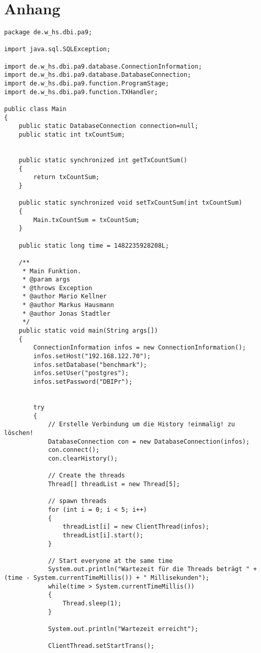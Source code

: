 \section{Anhang}

\begin{lstlisting}[caption={Main}, label={lst:pr1}]
package de.w_hs.dbi.pa9;

import java.sql.SQLException;

import de.w_hs.dbi.pa9.database.ConnectionInformation;
import de.w_hs.dbi.pa9.database.DatabaseConnection;
import de.w_hs.dbi.pa9.function.ProgramStage;
import de.w_hs.dbi.pa9.function.TXHandler;

public class Main 
{
	public static DatabaseConnection connection=null;
	public static int txCountSum;
	

	public static synchronized int getTxCountSum()
	{
		return txCountSum;
	}

	public static synchronized void setTxCountSum(int txCountSum)
	{
		Main.txCountSum = txCountSum;
	}

	public static long time = 1482235928208L;
	
	/**
	 * Main Funktion.
	 * @param args
	 * @throws Exception
	 * @author Mario Kellner
	 * @author Markus Hausmann
	 * @author Jonas Stadtler
	 */
	public static void main(String args[])
	{
		ConnectionInformation infos = new ConnectionInformation();
		infos.setHost("192.168.122.70");
		infos.setDatabase("benchmark");
		infos.setUser("postgres");
		infos.setPassword("DBIPr");
		
	
		try
		{
			// Erstelle Verbindung um die History !einmalig! zu löschen!			
			DatabaseConnection con = new DatabaseConnection(infos);
			con.connect();
			con.clearHistory();
			
		    // Create the threads
		    Thread[] threadList = new Thread[5];

		    // spawn threads
		    for (int i = 0; i < 5; i++)
		    {
		        threadList[i] = new ClientThread(infos);
		        threadList[i].start();
		    }
		    
		    // Start everyone at the same time
		    System.out.println("Wartezeit für die Threads beträgt " + (time - System.currentTimeMillis()) + " Millisekunden");
		    while(time > System.currentTimeMillis())
		    {
		    	Thread.sleep(1);
		    }
		    
		    System.out.println("Wartezeit erreicht");
		    
		    ClientThread.setStartTrans();
			

\end{lstlisting}
